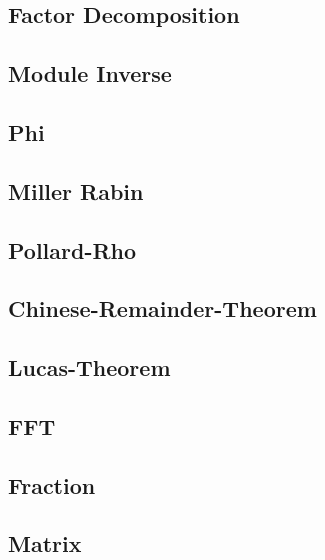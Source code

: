 \documentclass[a4paper,10pt,twocolumn,oneside]{article}
\begin{document}
\subsection{Factor Decomposition}

\subsection{Module Inverse}

\subsection{Phi}

\subsection{Miller Rabin}

\subsection{Pollard-Rho}

\subsection{Chinese-Remainder-Theorem}

\subsection{Lucas-Theorem}

\subsection{FFT}

\subsection{Fraction}

\subsection{Matrix}


\clearpage
\end{document}
